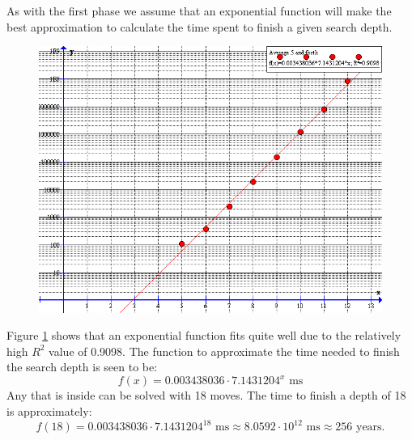 As with the first phase we assume that an exponential function will make the best approximation to calculate the time spent to finish a given search depth.

\begin{figure}[htb]
	\centering
		\includegraphics[scale=0.5]{input/pics/timeFunction2}
	\caption{}
	\label{fig:timeFunction2}
\end{figure}
Figure \ref{fig:timeFunction2} shows that an exponential function fits quite well due to the relatively high $R^2$ value of 0.9098.
The function to approximate the time needed to finish the search depth is seen to be:
\[
f(x) = 0.003438036 \cdot 7.1431204^{x} \text{ ms}
\]
Any \rubik{} that is inside  can be solved with 18  moves.
The time to finish a depth of 18 is approximately:
\[
f(18) = 0.003438036 \cdot 7.1431204^{18} \text{ ms} \approx 8.0592 \cdot 10^{12} \text{ ms} \approx 256 \text{ years.}
\]